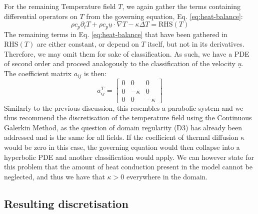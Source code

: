 \documentclass[sn-mathphys,Numbered]{sn-jnl}%
\theoremstyle{thmstyleone}%
\theoremstyle{thmstyletwo}%
\theoremstyle{thmstylethree}%
\begin{document}
For the remaining Temperature field $T$, we again gather the terms containing differential operators on $T$ from the governing equation, Eq. \ref{eq:heat-balance}:
\begin{equation}
    \rho c_p \partial_t T + \rho c_p \underline{u} \cdot \nabla T - \kappa \Delta T = \text{RHS}(T)
\end{equation}
The remaining terms in Eq. \ref{eq:heat-balance} that have been gathered in $\text{RHS}(T)$ are either constant, or depend on $T$ itself, but not in its derivatives. Therefore, we may omit them for sake of classification.
As such, we have a PDE of second order and proceed analogously to the classification of the velocity $\underline{u}$.
The coefficient matrix $a_{ij}$ is then:
\begin{equation}
    a_{ij}^{T} = \begin{bmatrix}
        0 & 0 & 0 \\
        0 & -\kappa & 0 \\
        0 & 0 & -\kappa
    \end{bmatrix}
\end{equation}
Similarly to the previous discussion, this resembles a parabolic system and we thus recommend the discretisation of the temperature field using the Continuous Galerkin Method, as the question of domain regularity (D3) has already been addressed and is the same for all fields.
If the coefficient of thermal diffusion $\kappa$ would be zero in this case, the governing equation would then collapse into a hyperbolic PDE and another classification would apply.
We can however state for this problem that the amount of heat conduction present in the model cannot be neglected, and thus we have that $\kappa > 0$ everywhere in the domain.

\subsection{Resulting discretisation}
\end{document}

